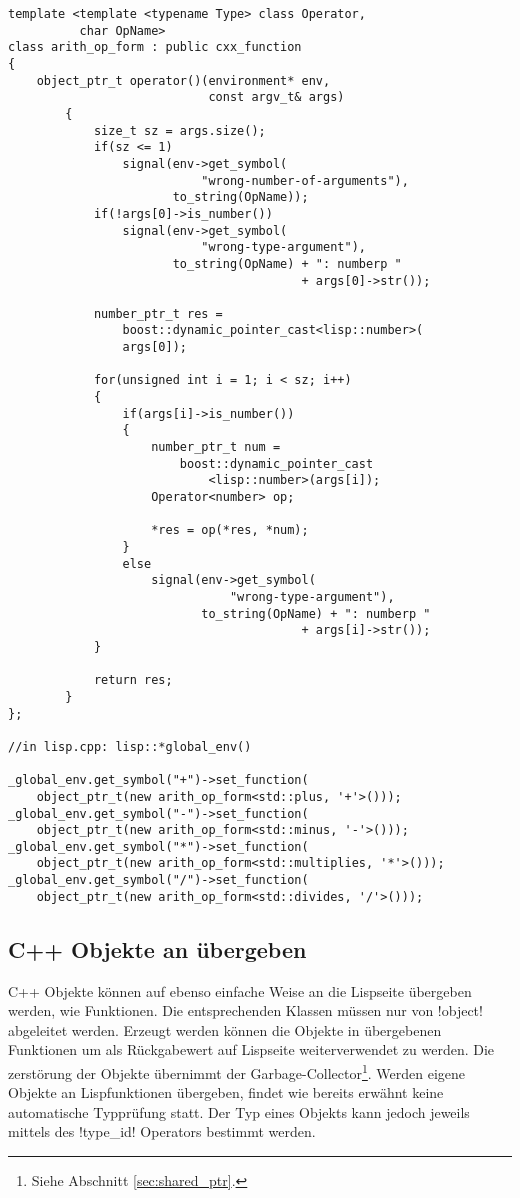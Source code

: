 \begin{lstlisting}[caption={Arithmetische Operatoren an Lisp übergeben}, label=lst:cxx_function]
template <template <typename Type> class Operator,
          char OpName>
class arith_op_form : public cxx_function
{
    object_ptr_t operator()(environment* env,
                            const argv_t& args)
        {
            size_t sz = args.size();
            if(sz <= 1)
                signal(env->get_symbol(
                           "wrong-number-of-arguments"),
                       to_string(OpName));
            if(!args[0]->is_number())
                signal(env->get_symbol(
                           "wrong-type-argument"),
                       to_string(OpName) + ": numberp "
                                         + args[0]->str());

            number_ptr_t res = 
                boost::dynamic_pointer_cast<lisp::number>(
                args[0]);

            for(unsigned int i = 1; i < sz; i++)
            {
                if(args[i]->is_number())
                {
                    number_ptr_t num =
                        boost::dynamic_pointer_cast
                            <lisp::number>(args[i]);
                    Operator<number> op;

                    *res = op(*res, *num);
                }
                else
                    signal(env->get_symbol(
                               "wrong-type-argument"),
                           to_string(OpName) + ": numberp "
                                         + args[i]->str());
            }

            return res;
        }
};

//in lisp.cpp: lisp::*global_env()

_global_env.get_symbol("+")->set_function(
    object_ptr_t(new arith_op_form<std::plus, '+'>()));
_global_env.get_symbol("-")->set_function(
    object_ptr_t(new arith_op_form<std::minus, '-'>()));
_global_env.get_symbol("*")->set_function(
    object_ptr_t(new arith_op_form<std::multiplies, '*'>()));
_global_env.get_symbol("/")->set_function(
    object_ptr_t(new arith_op_form<std::divides, '/'>()));
\end{lstlisting}

\subsection{C++ Objekte an \projectname{} übergeben}
\label{sec:cxx_object_interface}

C++ Objekte können auf ebenso einfache Weise an die Lispseite übergeben werden, wie Funktionen. Die entsprechenden Klassen müssen nur von !object! abgeleitet werden. Erzeugt werden können die Objekte in übergebenen Funktionen um als Rückgabewert auf Lispseite weiterverwendet zu werden. Die zerstörung der Objekte übernimmt der Garbage-Collector\footnote{Siehe Abschnitt \ref{sec:shared_ptr}.}. Werden eigene Objekte an Lispfunktionen übergeben, findet wie bereits erwähnt keine automatische Typprüfung statt. Der Typ eines Objekts kann jedoch jeweils mittels des !type_id! Operators bestimmt werden.
